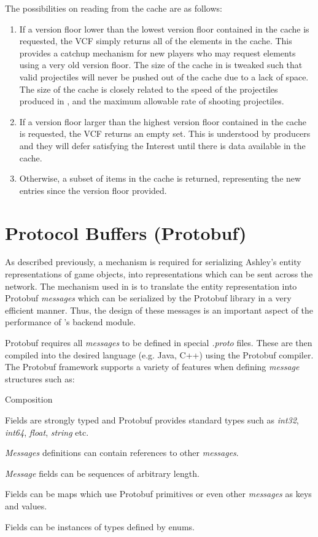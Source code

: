 The possibilities on reading from the cache are as follows:

\begin{enumerate}
    \item If a version floor lower than the lowest version floor contained in the cache is requested, the VCF simply returns all of the elements in the cache. This provides a catchup mechanism for new players who may request elements using a very old version floor. The size of the cache in \game{} is tweaked such that valid projectiles will never be pushed out of the cache due to a lack of space. The size of the cache is closely related to the speed of the projectiles produced in \game{}, and the maximum allowable rate of shooting projectiles. 
    \item If a version floor larger than the highest version floor contained in the cache is requested, the VCF returns an empty set. This is understood by producers and they will defer satisfying the Interest until there is data available in the cache.
    \item Otherwise, a subset of items in the cache is returned, representing the new entries since the version floor provided.
\end{enumerate}



\section{Protocol Buffers (Protobuf)}\label{sec:impl:proto}
As described previously, a mechanism is required for serializing Ashley's entity representations of game objects, into representations which can be sent across the network. The mechanism used in \game{} is to translate the entity representation into Protobuf \cite{proto} \textit{messages} which can be serialized by the Protobuf library in a very efficient manner. Thus, the design of these messages is an important aspect of the performance of \game{}'s backend module. 

Protobuf requires all \textit{messages} to be defined in special \textit{.proto} files. These are then compiled into the desired language (e.g. Java, C++) using the Protobuf compiler. The Protobuf framework supports a variety of features when defining \textit{message} structures such as:

\begin{labeling}{Composition  }
    \item [Typing] Fields are strongly typed and Protobuf provides standard types such as \textit{int32}, \textit{int64}, \textit{float}, \textit{string} etc.
    \item [Composition] \textit{Messages} definitions can contain references to other \textit{messages}.
    \item [Sequences] \textit{Message} fields can be sequences of arbitrary length.
    \item [Maps] Fields can be maps which use Protobuf primitives or even other \textit{messages} as keys and values.
    \item [Enums] Fields can be instances of types defined by enums.
\end{labeling}

